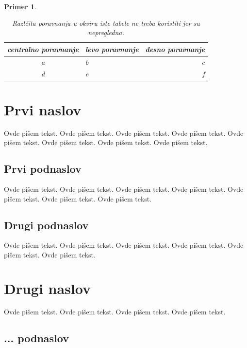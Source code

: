 \documentclass[a4paper]{article}
\newtheorem{primer}{Primer}[section]
\begin{document}
{\begin{primer}
\begin{table}[h!]
\begin{center}
\caption{Razlčita poravnanja u okviru iste tabele ne treba koristiti jer su nepregledna.}
\begin{tabular}{|c|l|r|} \hline
centralno poravnanje& levo poravnanje& desno poravnanje\\ \hline
a &b&c\\ \hline
d &e&f\\ \hline
\end{tabular}
\label{tab:tabela1}
\end{center}
\end{table}

\end{primer}





\section{Prvi naslov}
\label{sec:naslov1}


Ovde pišem tekst. 
Ovde pišem tekst. 
Ovde pišem tekst. 
Ovde pišem tekst. 
Ovde pišem tekst. 
Ovde pišem tekst. 
Ovde pišem tekst. 
Ovde pišem tekst. 


\subsection{Prvi podnaslov}
\label{subsec:podnaslov1}

Ovde pišem tekst. 
Ovde pišem tekst. 
Ovde pišem tekst. 
Ovde pišem tekst. 
Ovde pišem tekst. 
Ovde pišem tekst. 
Ovde pišem tekst. 

\subsection{Drugi podnaslov}
\label{subsec:podnaslov2}

Ovde pišem tekst. 
Ovde pišem tekst. 
Ovde pišem tekst. 
Ovde pišem tekst. 
Ovde pišem tekst. 
Ovde pišem tekst. 

\section{Drugi naslov}
\label{sec:naslov2}

Ovde pišem tekst. 
Ovde pišem tekst. 
Ovde pišem tekst. 
Ovde pišem tekst. 

\subsection{... podnaslov}
\label{subsec:podnaslovN}

}
\end{document}
